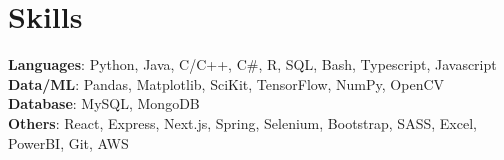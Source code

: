 \section{Skills}
 \begin{itemize}[leftmargin=0.15in, label={}]
    \small{\item{
     \textbf{Languages}{: Python, Java, C/C++, C\#, R, SQL, Bash, Typescript, Javascript} \\
     \textbf{Data/ML}{: Pandas, Matplotlib, SciKit, TensorFlow, NumPy, OpenCV} \\
     \textbf{Database}{: MySQL, MongoDB} \\
     \textbf{Others}{: React, Express, Next.js, Spring, Selenium, Bootstrap, SASS, Excel, PowerBI, Git, AWS} \\
     
    }}
 \end{itemize}
